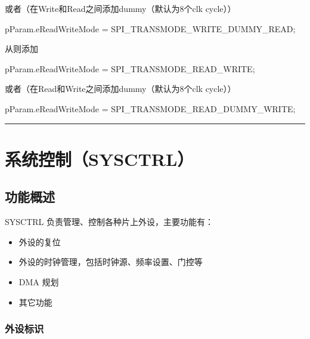 \documentclass[
  12pt,
]{book}
\newenvironment{Shaded}{\begin{snugshade}}{\end{snugshade}}
\newcommand{\NormalTok}[1]{#1}
\providecommand{\tightlist}{%
  \setlength{\itemsep}{0pt}\setlength{\parskip}{0pt}}
\begin{document}
或者（在Write和Read之间添加dummy（默认为8个clk cycle））

\begin{Shaded}
\begin{Highlighting}[]
\NormalTok{    pParam.eReadWriteMode = SPI_TRANSMODE_WRITE_DUMMY_READ;}
\end{Highlighting}
\end{Shaded}

从则添加

\begin{Shaded}
\begin{Highlighting}[]
\NormalTok{    pParam.eReadWriteMode = SPI_TRANSMODE_READ_WRITE;}
\end{Highlighting}
\end{Shaded}

或者（在Read和Write之间添加dummy（默认为8个clk cycle））

\begin{Shaded}
\begin{Highlighting}[]
\NormalTok{    pParam.eReadWriteMode = SPI_TRANSMODE_READ_DUMMY_WRITE;}
\end{Highlighting}
\end{Shaded}

\begin{center}\rule{0.5\linewidth}{0.5pt}\end{center}

\hypertarget{ch-sysctrl}{%
\chapter{系统控制（SYSCTRL）}\label{ch-sysctrl}}

\hypertarget{ux529fux80fdux6982ux8ff0-4}{%
\section{功能概述}\label{ux529fux80fdux6982ux8ff0-4}}

SYSCTRL 负责管理、控制各种片上外设，主要功能有：

\begin{itemize}
\tightlist
\item
  外设的复位
\item
  外设的时钟管理，包括时钟源、频率设置、门控等
\item
  DMA 规划
\item
  其它功能
\end{itemize}

\hypertarget{ux5916ux8bbeux6807ux8bc6}{%
\subsection{外设标识}\label{ux5916ux8bbeux6807ux8bc6}}
\end{document}
